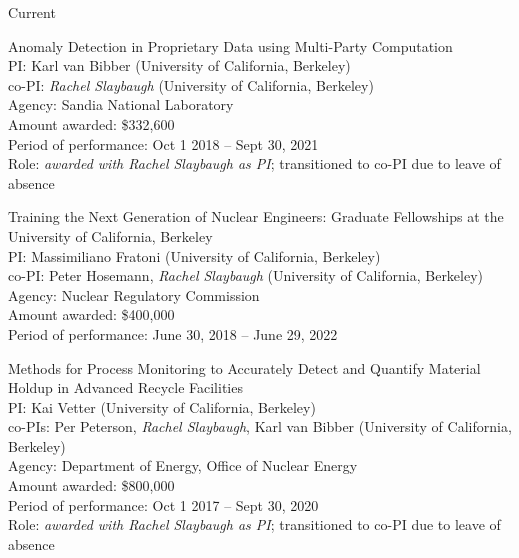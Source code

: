 \begin{rSubsection}{Current}{}{}{}
\item Anomaly Detection in Proprietary Data using Multi-Party Computation	\\
PI: Karl van Bibber (University of California, Berkeley) \\
\hspace*{1 em} co-PI: \textit{Rachel Slaybaugh} (University of California, Berkeley)\\
Agency: Sandia National Laboratory \\
Amount awarded: \$332,600\\
Period of performance: Oct 1 2018 -- Sept 30, 2021\\
Role: \textit{awarded with Rachel Slaybaugh as PI}; transitioned to co-PI due to leave of absence

\vspace*{0.3 em}
\item Training the Next Generation of Nuclear Engineers: Graduate Fellowships at the University of California, Berkeley	\\
PI: Massimiliano Fratoni (University of California, Berkeley) \\
\hspace*{1 em} co-PI: Peter Hosemann, \textit{Rachel Slaybaugh} (University of California, Berkeley)\\
Agency: Nuclear Regulatory Commission \\
Amount awarded: \$400,000\\
Period of performance: June 30, 2018 -- June 29, 2022

\vspace*{0.3 em}
\item Methods for Process Monitoring to Accurately Detect and Quantify Material Holdup in Advanced Recycle Facilities	\\
PI: Kai Vetter (University of California, Berkeley) \\
\hspace*{1 em} co-PIs:  Per Peterson, \textit{Rachel Slaybaugh}, Karl van Bibber (University of California, Berkeley)\\
Agency: Department of Energy, Office of Nuclear Energy \\
Amount awarded: \$800,000\\
Period of performance: Oct 1 2017 -- Sept 30, 2020\\
Role: \textit{awarded with Rachel Slaybaugh as PI}; transitioned to co-PI due to leave of absence


\end{rSubsection}
